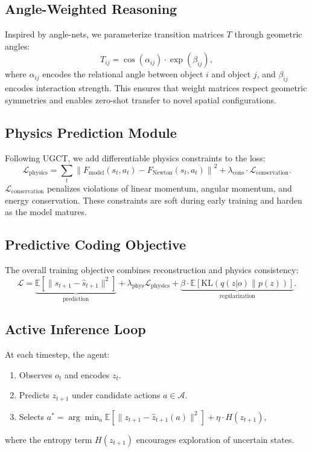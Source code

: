 \documentclass[11pt,oneside]{article}
\begin{document}
\subsection{Angle-Weighted Reasoning}

Inspired by angle-nets, we parameterize transition matrices $T$ through geometric angles:
\[
T_{ij} = \cos(\alpha_{ij}) \cdot \exp(\beta_{ij}),
\]
where $\alpha_{ij}$ encodes the relational angle between object $i$ and object $j$, and $\beta_{ij}$ encodes interaction strength. This ensures that weight matrices respect geometric symmetries and enables zero-shot transfer to novel spatial configurations.

\subsection{Physics Prediction Module}

Following UGCT, we add differentiable physics constraints to the loss:
\[
\mathcal{L}_{\text{physics}} = \sum_{t} \left\| F_{\text{model}}(s_t, a_t) - F_{\text{Newton}}(s_t, a_t) \right\|^2 + \lambda_{\text{cons}} \cdot \mathcal{L}_{\text{conservation}}.
\]
$\mathcal{L}_{\text{conservation}}$ penalizes violations of linear momentum, angular momentum, and energy conservation. These constraints are soft during early training and harden as the model matures.

\subsection{Predictive Coding Objective}

The overall training objective combines reconstruction and physics consistency:
\[
\mathcal{L} = \underbrace{\mathbb{E}\left[\| s_{t+1} - \hat{s}_{t+1} \|^2 \right]}_{\text{prediction}} + \lambda_{\text{phys}} \mathcal{L}_{\text{physics}} + \underbrace{\beta \cdot \mathbb{E}\left[ \text{KL}(q(z|o) \| p(z)) \right]}_{\text{regularization}}.
\]

\subsection{Active Inference Loop}

At each timestep, the agent:
\begin{enumerate}
  \item Observes $o_t$ and encodes $z_t$.
  \item Predicts $z_{t+1}$ under candidate actions $a \in \mathcal{A}$.
  \item Selects $a^* = \arg\min_a \mathbb{E}\left[ \| z_{t+1} - \hat{z}_{t+1}(a) \|^2 \right] + \eta \cdot H(z_{t+1})$,
\end{enumerate}
where the entropy term $H(z_{t+1})$ encourages exploration of uncertain states.
\end{document}
